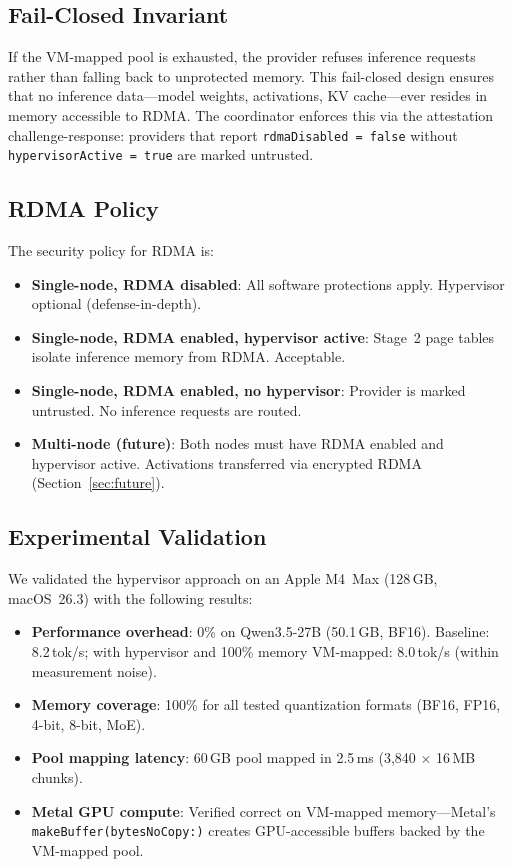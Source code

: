 \documentclass[10pt,twocolumn,letterpaper]{article}
\begin{document}
\subsection{Fail-Closed Invariant}

If the VM-mapped pool is exhausted, the provider refuses inference requests rather than falling back to unprotected memory. This fail-closed design ensures that no inference data---model weights, activations, KV cache---ever resides in memory accessible to RDMA. The coordinator enforces this via the attestation challenge-response: providers that report \texttt{rdmaDisabled = false} without \texttt{hypervisorActive = true} are marked untrusted.

\subsection{RDMA Policy}

The security policy for RDMA is:
\begin{itemize}[leftmargin=*,itemsep=1pt]
    \item \textbf{Single-node, RDMA disabled}: All software protections apply. Hypervisor optional (defense-in-depth).
    \item \textbf{Single-node, RDMA enabled, hypervisor active}: Stage~2 page tables isolate inference memory from RDMA. Acceptable.
    \item \textbf{Single-node, RDMA enabled, no hypervisor}: Provider is marked untrusted. No inference requests are routed.
    \item \textbf{Multi-node (future)}: Both nodes must have RDMA enabled and hypervisor active. Activations transferred via encrypted RDMA (Section~\ref{sec:future}).
\end{itemize}

\subsection{Experimental Validation}

We validated the hypervisor approach on an Apple M4~Max (128\,GB, macOS~26.3) with the following results:
\begin{itemize}[leftmargin=*,itemsep=1pt]
    \item \textbf{Performance overhead}: 0\% on Qwen3.5-27B (50.1\,GB, BF16). Baseline: 8.2\,tok/s; with hypervisor and 100\% memory VM-mapped: 8.0\,tok/s (within measurement noise).
    \item \textbf{Memory coverage}: 100\% for all tested quantization formats (BF16, FP16, 4-bit, 8-bit, MoE).
    \item \textbf{Pool mapping latency}: 60\,GB pool mapped in 2.5\,ms (3,840 $\times$ 16\,MB chunks).
    \item \textbf{Metal GPU compute}: Verified correct on VM-mapped memory---Metal's \texttt{makeBuffer(bytesNoCopy:)} creates GPU-accessible buffers backed by the VM-mapped pool.
\end{itemize}
\end{document}

